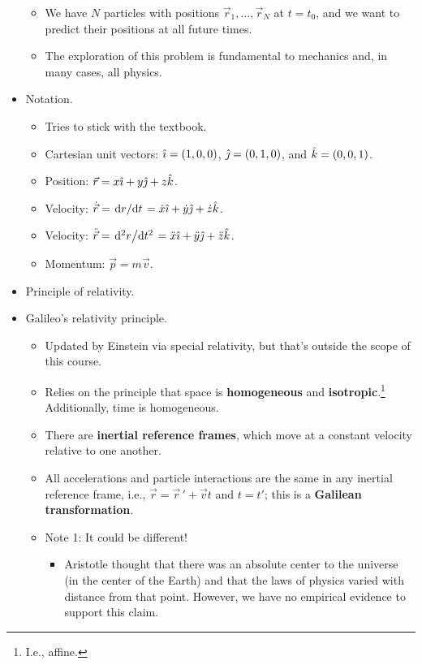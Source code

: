 \documentclass[../notes.tex]{subfiles}
\begin{document}
\begin{itemize}
    \begin{itemize}
        \item We have $N$ particles with positions $\vec{r}_1,\dots,\vec{r}_N$ at $t=t_0$, and we want to predict their positions at all future times.
        \item The exploration of this problem is fundamental to mechanics and, in many cases, all physics.
    \end{itemize}
    \item Notation.
    \begin{itemize}
        \item Tries to stick with the textbook.
        \item Cartesian unit vectors: $\hat{\imath}=(1,0,0)$, $\hat{\jmath}=(0,1,0)$, and $\hat{k}=(0,0,1)$.
        \item Position: $\vec{r}=x\hat{\imath}+y\hat{\jmath}+z\hat{k}$.
        \item Velocity: $\dot{\vec{r}}=\dv*{r}{t}=\dot{x}\hat{\imath}+\dot{y}\hat{\jmath}+\dot{z}\hat{k}$.
        \item Velocity: $\ddot{\vec{r}}=\dv*[2]{r}{t}=\ddot{x}\hat{\imath}+\ddot{y}\hat{\jmath}+\ddot{z}\hat{k}$.
        \item Momentum: $\vec{p}=m\vec{v}$.
    \end{itemize}
    \item Principle of relativity.
    \item Galileo's relativity principle.
    \begin{itemize}
        \item Updated by Einstein via special relativity, but that's outside the scope of this course.
        \item Relies on the principle that space is \textbf{homogeneous} and \textbf{isotropic}.\footnote{I.e., affine.} Additionally, time is homogeneous.
        \item There are \textbf{inertial reference frames}, which move at a constant velocity relative to one another.
        \item All accelerations and particle interactions are the same in any inertial reference frame, i.e., $\vec{r}=\vec{r}{\,}'+\vec{v}t$ and $t=t'$; this is a \textbf{Galilean transformation}.
        \item Note 1: It could be different!
        \begin{itemize}
            \item Aristotle thought that there was an absolute center to the universe (in the center of the Earth) and that the laws of physics varied with distance from that point. However, we have no empirical evidence to support this claim.

\end{itemize}
\end{itemize}
\end{itemize}
\end{document}
